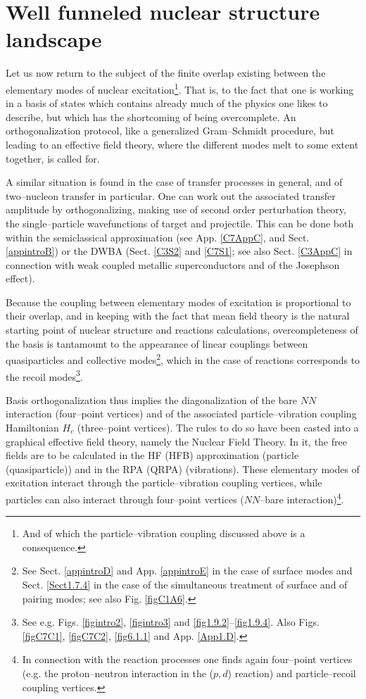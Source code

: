 \section{Well funneled nuclear structure landscape}\label{C1S4}
Let us now return to the subject of the finite overlap existing between the elementary modes of nuclear excitation\footnote{And of which the particle--vibration coupling discussed above is a consequence.}. That is, to the fact that one is working in a basis of states which contains already much of the physics one likes to describe, but which has the shortcoming of being overcomplete. An orthogonalization protocol, like a generalized Gram--Schmidt procedure, but leading to an effective field theory, where the different modes melt to some extent together, is called for.

A similar situation is found in the case of transfer processes in general, and of two--nucleon transfer in particular. One can work out the associated transfer amplitude by orthogonalizing, making use of second order perturbation theory, the single--particle wavefunctions of target and projectile. This can be done both within the semiclassical approximation (see App. \ref{C7AppC}, and Sect. \ref{appintroB}) or the  DWBA (Sect. \ref{C3S2} and \ref{C7S1}; see also Sect. \ref{C3AppC} in connection with weak coupled metallic superconductors and of the Josephson effect). 

Because the coupling between elementary modes of excitation is proportional to their overlap, and in keeping with the fact that mean field theory is the natural starting point of nuclear structure and reactions calculations, overcompleteness of the basis is tantamount to the appearance of linear couplings between quasiparticles and collective modes\footnote{See Sect. \ref{appintroD} and App. \ref{appintroE} in the case of surface modes and Sect. \ref{Sect1.7.4} in the case of the simultaneous treatment of surface and of pairing modes; see also Fig. \ref{figC1A6}.}, which in the case of reactions corresponds to the recoil modes\footnote{See e.g. Figs. \ref{figintro2}, \ref{figintro3} and \ref{fig1.9.2}--\ref{fig1.9.4}.  Also Figs.  \ref{figC7C1}, \ref{figC7C2}, \ref{fig6.1.1} and  App. \ref{App1.D}.}.


Basis orthogonalization thus implies the diagonalization of the bare $NN$ interaction (four--point vertices) and of the  associated particle--vibration coupling Hamiltonian $H_c$ (three--point vertices). The rules to do so have been casted into a graphical effective field theory, namely the Nuclear Field Theory. In it, the free fields are to be calculated in the HF (HFB) approximation (particle (quasiparticle)) and in the RPA (QRPA) (vibrations). These elementary modes of excitation interact through the particle--vibration coupling vertices, while particles can also interact through four--point vertices ($NN$--bare interaction)\footnote{In connection with the reaction processes one finds again four--point vertices (e.g. the proton--neutron interaction in the ($p,d$) reaction) and particle--recoil coupling vertices.}.


